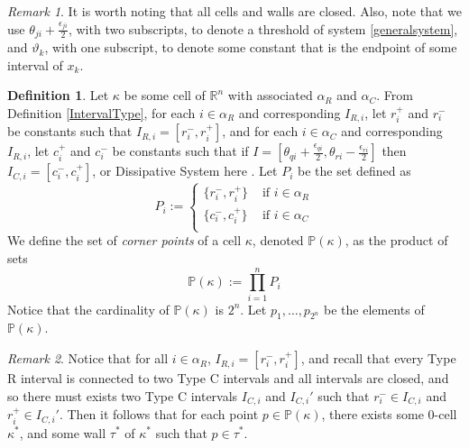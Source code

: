 \documentclass[12pt]{article}
\theoremstyle{definition}
\newtheorem{defn}{Definition}[section]
\theoremstyle{remark}
\newtheorem{remark}{Remark}[section]
\newcommand{\bbR}{\mathbb{R}} %
\newcommand{\bbP}{\mathbb{P}}
\begin{document}
\begin{remark}
It is worth noting that all cells and walls are closed. Also, note that we use $\theta_{ji}+\frac{\epsilon_{ji}}{2}$, with two subscripts, to denote a threshold of system \eqref{generalsystem}, and $\vartheta_k$, with one subscript, to denote some constant that is the endpoint of some interval of $x_k$.
\end{remark}

\begin{defn} \label{cornersetdefn}
Let $\kappa$ be some cell of $\bbR^n$ with associated $\alpha_R$ and $\alpha_C$. From Definition \ref{IntervalType}, for each $i\in\alpha_R$ and corresponding $I_{R,i}$, let $r_i^+$ and $r_i^-$ be constants such that $I_{R,i}=[r_i^-,r_i^+]$, and for each $i\in\alpha_C$ and corresponding $I_{R,i}$, let $c_i^+$ and $c_i^-$ be constants such that if $I=[\theta_{qi}+\frac{\epsilon_{qi}}{2},\theta_{ri}-\frac{\epsilon_{ri}}{2}]$ then $I_{C,i}=[c_i^-,c_i^+]$, or {\color{cyan} Dissipative System here} . Let $P_i$ be the set defined as 
\begin{equation} \label{cornersetequation}
P_i :=
\begin{cases}
\{r_i^-,r_i^+\} &  \text{ if } i\in \alpha_R \\
\{c_i^-,c_i^+\} &  \text{ if } i\in \alpha_C \\
\end{cases}
\end{equation}
We define the set of \textit{corner points} of a cell $\kappa$, denoted $\bbP(\kappa)$, as the product of sets 
\begin{equation*}
\bbP (\kappa) := \prod_{i=1}^n P_i
\end{equation*}
Notice that the cardinality of $\bbP (\kappa)$ is $2^n$. Let $p_1,\dots,p_{2^n}$ be the elements of $\bbP (\kappa)$.
\end{defn}

\begin{remark} \label{cornerpointsin0cell}
Notice that for all $i\in\alpha_R$, $I_{R,i}=[r_i^-,r_i^+]$, and recall that every Type R interval is connected to two Type C intervals and all intervals are closed, and so there must exists two Type C intervals $I_{C,i}$ and $I_{C,i}'$ such that $r_i^-\in I_{C,i}$ and  $r_i^+\in I_{C,i}'$. Then it follows that for each point $p\in\bbP(\kappa)$, there exists some $0$-cell $\kappa^*$, and some wall $\tau^*$ of $\kappa^*$ such that $p\in\tau^*$. 
\end{remark}
\end{document}
